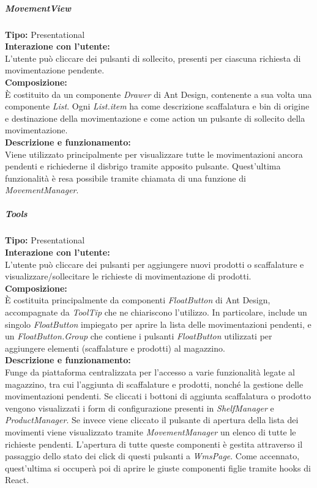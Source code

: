 \newpage
\subparagraph{\colorbox{verde_uml}{MovementView}}
\textbf{Tipo:} Presentational \\
\textbf{Interazione con l'utente:} \\
L'utente può cliccare dei pulsanti di sollecito, presenti per ciascuna richiesta di movimentazione pendente.\\
\textbf{Composizione:} \\
È costituito da un componente \textit{Drawer} di Ant Design, contenente a sua volta una componente \textit{List}. Ogni \textit{List.item} ha come descrizione scaffalatura e bin di origine e destinazione della movimentazione e come action un pulsante di sollecito della movimentazione.\\
\textbf{Descrizione e funzionamento:} \\
Viene utilizzato principalmente per visualizzare tutte le movimentazioni ancora pendenti e richiederne il disbrigo tramite apposito pulsante. Quest'ultima funzionalità è resa possibile tramite chiamata di una funzione di \textit{MovementManager}. 

\subparagraph{\colorbox{verde_uml}{Tools}}
\textbf{Tipo:} Presentational \\
\textbf{Interazione con l'utente:} \\
L'utente può cliccare dei pulsanti per aggiungere nuovi prodotti o scaffalature e visualizzare/sollecitare le richieste di movimentazione di prodotti.
\\
\textbf{Composizione:} \\
È costituita principalmente da componenti \textit{FloatButton} di Ant Design, accompagnate da \textit{ToolTip} che ne chiariscono l'utilizzo. In particolare, include un singolo \textit{FloatButton} impiegato per aprire la lista delle movimentazioni pendenti, e un \textit{FloatButton.Group} che contiene i pulsanti \textit{FloatButton} utilizzati per aggiungere elementi (scaffalature e prodotti) al magazzino.\\
\textbf{Descrizione e funzionamento:} \\
Funge da piattaforma centralizzata per l'accesso a varie funzionalità legate al magazzino, tra cui l'aggiunta di scaffalature e prodotti, nonché la gestione delle movimentazioni pendenti.
Se cliccati i bottoni di aggiunta scaffalatura o prodotto vengono visualizzati i form di configurazione presenti in \textit{ShelfManager} e \textit{ProductManager}. Se invece viene cliccato il pulsante di apertura della lista dei movimenti viene visualizzato tramite \textit{MovementManager} un elenco di tutte le richieste pendenti. L'apertura di tutte queste componenti è gestita attraverso il passaggio dello stato dei click di questi pulsanti a \textit{WmsPage}. Come accennato, quest'ultima si occuperà poi di aprire le giuste componenti figlie tramite hooks di React. 

